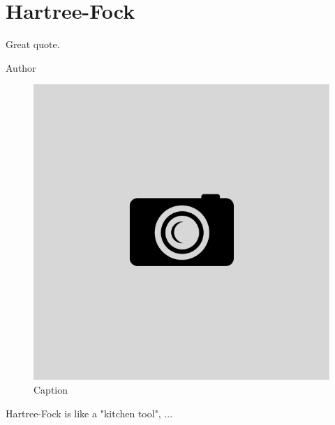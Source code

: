 \chapter{Hartree-Fock} \label{chp:hartreefock}
\epigraph{Great quote.}{Author}
\begin{figure}[H]
	\centering
	\includegraphics[scale=0.4]{Images/example.png}
	\caption{Caption}
\end{figure}
Hartree-Fock is like a "kitchen tool", ... 